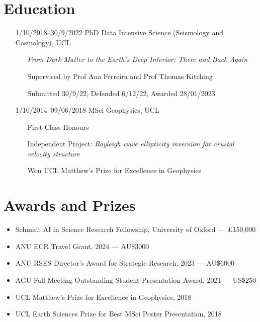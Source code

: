 \section{Education}

\begin{itemize}
    \item[1/10/2018--30/9/2022] PhD Data Intensive Science (Seismology and Cosmology), UCL
        \begin{itemize}
            \item[] \textit{From Dark Matter to the Earth's Deep Interior: There and Back Again}
            \item[] Supervised by Prof Ana Ferreira and Prof Thomas Kitching
            \item[] Submitted 30/9/22, Defended 6/12/22, Awarded 28/01/2023
        \end{itemize}
    \item[1/10/2014--09/06/2018] MSci Geophysics, UCL
        \begin{itemize}
            \item[] First Class Honours
            \item[] Independent Project: \textit{Rayleigh wave ellipticity inversion for crustal velocity structure}
            \item[] Won UCL Matthew's Prize for Excellence in Geophysics
        \end{itemize}
\end{itemize}

\section{Awards and Prizes}

\begin{itemize}[label={}, nosep]
    \item Schmidt AI in Science Research Fellowship, University of Oxford --- £150,000
    \item ANU ECR Travel Grant, 2024 --- AU\$3000
    \item ANU RSES Director's Award for Strategic Research, 2023 --- AU\$6000
    \item AGU Fall Meeting Outstanding Student Presentation Award, 2021 --- US\$250
    \item UCL Matthew's Prize for Excellence in Geophysics, 2018
    \item UCL Earth Sciences Prize for Best MSci Poster Presentation, 2018
\end{itemize}


